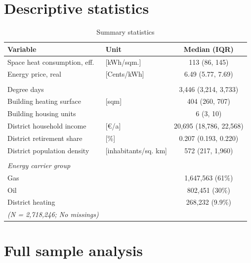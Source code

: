 \documentclass[12pt,twoside]{reedthesis}
\begin{document}
\hypertarget{descriptives}{%
\section{Descriptive statistics}\label{descriptives}}
\begin{table}[]
\centering
\caption{Summary statistics}
\label{tab:summarytable}
\begin{tabular}{@{}llc@{}}
\toprule
\textbf{Variable}             & \textbf{Unit}            & \textbf{Median (IQR)}   \\ \midrule
Space heat consumption, eff.  & {[}kWh/sqm.{]}           & 113 (86, 145)           \\
Energy price, real            & {[}Cents/kWh{]}          & 6.49 (5.77, 7.69)       \\
                              &                          &                         \\
Degree days                   &                          & 3,446 (3,214, 3,733)    \\
Building heating surface      & {[}sqm{]}                & 404 (260, 707)          \\
Building housing units        &                          & 6 (3, 10)               \\
District household income     & {[}€/a{]}                & 20,695 (18,786, 22,568) \\
District retirement share     & {[}\%{]}                 & 0.207 (0.193, 0.220)    \\
District population density   & {[}inhabitants/sq. km{]} & 572 (217, 1,960)        \\
                              &                          &                         \\
\textit{Energy carrier group} & {\ul \textit{}}          &                         \\
Gas                           &                          & 1,647,563 (61\%)        \\
Oil                           &                          & 802,451 (30\%)          \\
District heating              &                          & 268,232 (9.9\%)         \\ \midrule
\textit{(N = 2,718,246; No missings)}  &                          & \multicolumn{1}{l}{}   
\end{tabular}
\end{table}
\hypertarget{full_results}{%
\section{Full sample analysis}\label{full_results}}
\end{document}
